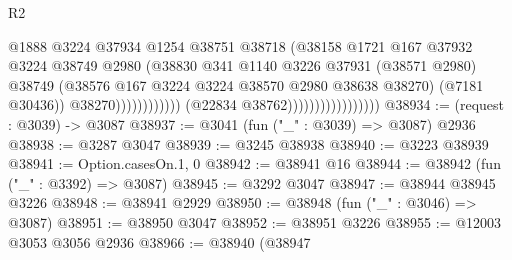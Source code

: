 \begin{lexlean}{R2}
\begin{coremodule}
                                                          @1888
                                                          @3224
                                                          @37934
                                                          @1254
                                                          @38751
                                                          @38718
                                                          (@38158
                                                            @1721
                                                            @167
                                                            @37932
                                                            @3224
                                                            @38749
                                                            @2980
                                                            (@38830
                                                              @341
                                                              @1140
                                                              @3226
                                                              @37931
                                                              (@38571 @2980)
                                                              @38749
                                                              (@38576
                                                                @167
                                                                @3224
                                                                @3224
                                                                @38570
                                                                @2980
                                                                @38638
                                                                @38270)
                                                              (@7181 @30436))
                                                            @38270))))))))))))
                                    (@22834 @38762)))))))))))))))))
@38934 := (request : @3039) -> @3087
@38937 := @3041 (fun ("_" : @3039) => @3087) @2936
@38938 := @3287 @3047
@38939 := @3245 @38938
@38940 := @3223 @38939
@38941 := Option.casesOn.{1, 0}
@38942 := @38941 @16
@38944 := @38942 (fun ("_" : @3392) => @3087)
@38945 := @3292 @3047
@38947 := @38944 @38945 @3226
@38948 := @38941 @2929
@38950 := @38948 (fun ("_" : @3046) => @3087)
@38951 := @38950 @3047
@38952 := @38951 @3226
@38955 := @12003 @3053 @3056 @2936
@38966 := @38940
    (@38947

\end{coremodule}
\end{lexlean}
